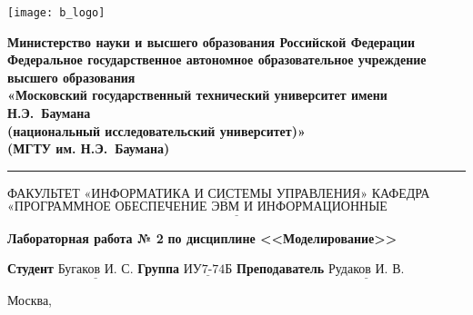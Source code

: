\thispagestyle{empty}

\noindent \begin{minipage}{0.15\textwidth}
\texttt{[image: b\_logo]}
\end{minipage}
\noindent\begin{minipage}{0.85\textwidth}\centering
	\textbf{Министерство науки и высшего образования Российской Федерации}\\
	\textbf{Федеральное государственное автономное образовательное учреждение высшего образования}\\
	\textbf{«Московский государственный технический университет имени Н.Э.~Баумана}\\
	\textbf{(национальный исследовательский университет)»}\\
	\textbf{(МГТУ им. Н.Э.~Баумана)}
\end{minipage}

\noindent\rule{\linewidth}{3pt}
\newline\newline
\noindent ФАКУЛЬТЕТ $\underline{\text{«ИНФОРМАТИКА И СИСТЕМЫ УПРАВЛЕНИЯ»}}$ \newline\newline
\noindent КАФЕДРА $\underline{\text{«ПРОГРАММНОЕ ОБЕСПЕЧЕНИЕ ЭВМ И ИНФОРМАЦИОННЫЕ ТЕХНОЛОГИИ»}}$

\vspace{1cm}

\begin{center}
	\noindent\begin{minipage}{1.3\textwidth}\centering
		\Large\textbf{  Лабораторная работа № 2}\newline
		\textbf{по дисциплине <<Моделирование>>}\newline\newline
	\end{minipage}
\end{center}

\noindent\textbf{Студент} $\underline{\text{Бугаков И. С.}}$\newline\newline
\noindent\textbf{Группа} $\underline{\text{ИУ7-74Б}}$\newline\newline
\noindent\textbf{Преподаватель} $\underline{\text{Рудаков И. В.}}$\newline

\begin{center}
	\vfill
	Москва,~\the\year
\end{center}
\clearpage